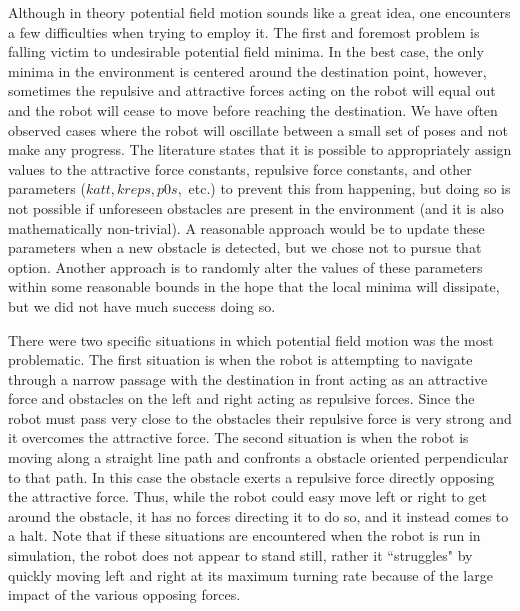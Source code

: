 \documentclass[12pt]{article}
\begin{document}
Although in theory potential field motion sounds like a great idea, one encounters a few difficulties when trying to employ it. The first and foremost problem is falling victim to undesirable potential field minima. In the best case, the only minima in the environment is centered around the destination point, however, sometimes the repulsive and attractive forces acting on the robot will equal out and the robot will cease to move before reaching the destination. We have often observed cases where the robot will oscillate between a small set of poses and not make any progress. The literature states that it is possible to appropriately assign values to the attractive force constants, repulsive force constants, and other parameters ($katt, kreps, p0s,$ etc.) to prevent this from happening, but doing so is not possible if unforeseen obstacles are present in the environment (and it is also mathematically non-trivial). A reasonable approach would be to update these parameters when a new obstacle is detected, but we chose not to pursue that option. Another approach is to randomly alter the values of these parameters within some reasonable bounds in the hope that the local minima will dissipate, but we did not have much success doing so.

There were two specific situations in which potential field motion was the most problematic. The first situation is when the robot is attempting to navigate through a narrow passage with the destination in front acting as an attractive force and obstacles on the left and right acting as repulsive forces. Since the robot must pass very close to the obstacles their repulsive force is very strong and it overcomes the attractive force. The second situation is when the robot is moving along a straight line path and confronts a obstacle oriented perpendicular to that path. In this case the obstacle exerts a repulsive force directly opposing the attractive force. Thus, while the robot could easy move left or right to get around the obstacle, it has no forces directing it to do so, and it instead comes to a halt. Note that if these situations are encountered when the robot is run in simulation, the robot does not appear to stand still, rather it ``struggles" by quickly moving left and right at its maximum turning rate because of the large impact of the various opposing forces.
\end{document}
